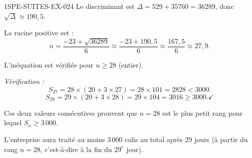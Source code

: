 \begin{corrige}{1SPE-SUITES-EX-024}
Le discriminant est $\Delta = 529 + 35760 = 36289$, donc $\sqrt{\Delta} \approx 190{,}5$.

La racine positive est :
\[
  n = \frac{-23 + \sqrt{36289}}{6} \approx \frac{-23 + 190{,}5}{6} \approx \frac{167{,}5}{6} \approx 27{,}9.
\]

L'inéquation est vérifiée pour $n \geq 28$ (entier).

\textit{Vérification :}
\[
  S_{27} = 28 \times (20 + 3 \times 27) = 28 \times 101 = 2828 < 3000.
\]
\[
  S_{28} = 29 \times (20 + 3 \times 28) = 29 \times 104 = 3016 \geq 3000. \checkmark
\]

Ces deux valeurs consécutives prouvent que $n=28$ est le plus petit rang pour lequel $S_n \geq 3\,000$.

L'entreprise aura traité au moins $3\,000$ colis au total après $\boxed{29}$ jours (à partir du rang $n = 28$, c'est-à-dire à la fin du $29^e$ jour).

\end{corrige}
